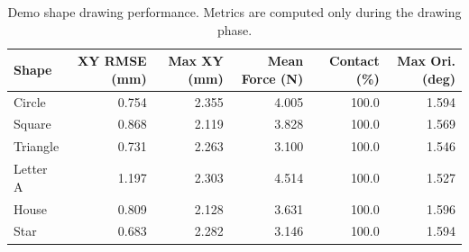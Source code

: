 \begin{table}[H]
\centering
\caption{Demo shape drawing performance. Metrics are computed only during the drawing phase.}
\small
\begin{tabular}{lrrrrr}
\toprule
Shape & XY RMSE (mm) & Max XY (mm) & Mean Force (N) & Contact (\%) & Max Ori. (deg) \\
\midrule
Circle & 0.754 & 2.355 & 4.005 & 100.0 & 1.594 \\
Square & 0.868 & 2.119 & 3.828 & 100.0 & 1.569 \\
Triangle & 0.731 & 2.263 & 3.100 & 100.0 & 1.546 \\
Letter A & 1.197 & 2.303 & 4.514 & 100.0 & 1.527 \\
House & 0.809 & 2.128 & 3.631 & 100.0 & 1.596 \\
Star & 0.683 & 2.282 & 3.146 & 100.0 & 1.594 \\
\bottomrule
\end{tabular}
\end{table}
